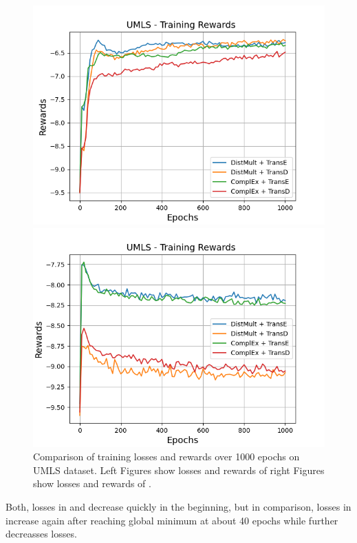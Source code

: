 \begin{figure}
\begin{minipage}{.5\textwidth}
      \includegraphics[width=0.9\linewidth]{figures/results/gan_train/not_pretrained/random/umls/epochs1000/random_umls_rew.png}
    \end{minipage}%
    \begin{minipage}{.5\textwidth}
      \centering
      \includegraphics[width=0.9\linewidth]{figures/results/gan_train/not_pretrained/uncertainty/max_distribution/entropy/umls/1k_epochs/uncertainty_umls_rew.png}
    \end{minipage}%
    \caption{Comparison of training losses and rewards over 1000 epochs on \textsc{UMLS} dataset.
    Left Figures show losses and rewards of \origsamplingand right Figures show losses and rewards of \ussoftmax.}
    \label{fig:advtrain_umls_losses_rewards}
\end{figure}
Both, losses in \origsampling and \ussoftmax decrease quickly in the beginning, but in comparison, losses in \origsampling increase again after reaching global minimum at about 40 epochs while \ussoftmax further decreasses losses.
